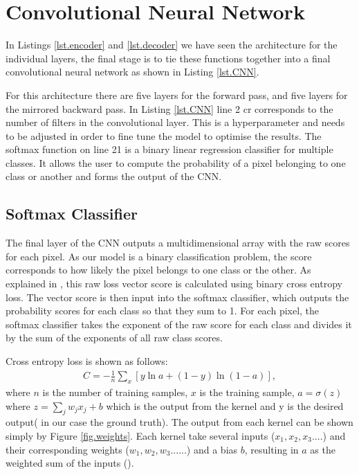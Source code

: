 \section{Convolutional Neural Network}\label{sub.CNN}
In Listings \ref{lst.encoder} and \ref{lst.decoder} we have seen the architecture for the individual layers, the final stage is to tie these functions together into a final convolutional neural network as shown in Listing \ref{lst.CNN}.


For this architecture there are five layers for the forward pass, and five layers for the mirrored backward pass. In Listing \ref{lst.CNN} line 2 cr corresponds to the number of filters in the convolutional layer. This is a hyperparameter and needs to be adjusted in order to fine tune the model to optimise the results. The softmax function on line 21 is a binary linear regression classifier for multiple classes. It allows the user to compute the probability of a pixel belonging to one class or another and forms the output of the CNN.
\subsection{Softmax Classifier}\label{sec.softmax}
The final layer of the CNN outputs a multidimensional array with the raw scores for each pixel. As our model is a binary classification problem, the score corresponds to how likely the pixel belongs to one class or the other. As explained in \citet{Richmond19a}, this raw loss vector score is calculated using binary cross entropy loss. The vector score is then input into the softmax classifier, which outputs the probability scores for each class so that they sum to 1. For each pixel, the softmax classifier takes the exponent of the raw score for each class and divides it by the sum of the exponents of all raw class scores.
\par
Cross entropy loss is shown as follows:
\begin{eqnarray} 
  C = -\frac{1}{n} \sum_x \left[y \ln a + (1-y ) \ln (1-a) \right],
\end{eqnarray}
where $n$ is the number of training samples, $x$ is the training sample, $a = \sigma(z)$ where $z =
\sum_j w_j x_j+b$
which is the output from the kernel and y is the desired output( in our case the ground truth). The output from each kernel can be shown simply by Figure \ref{fig.weights}. Each kernel take several inputs ($x_1, x_2, x_3....$) and their corresponding weights ($w_1, w_2, w_3......$) and a bias $b$, resulting in $a$ as the weighted sum of the inputs (\cite{nielsen15}). 

